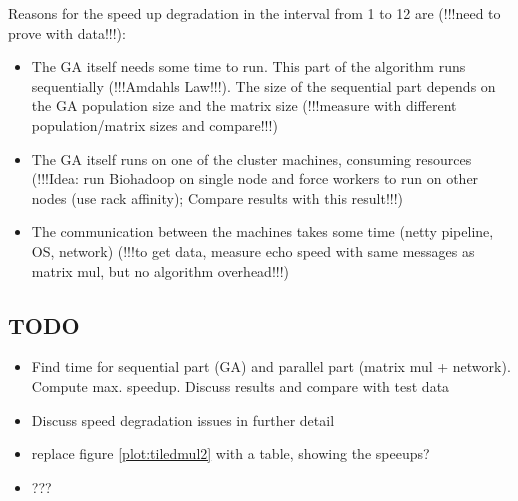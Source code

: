\documentclass{article}
\begin{document}
Reasons for the speed up degradation in the interval from 1 to 12 are (!!!need to prove with data!!!):
\begin{itemize}
  \item The GA itself needs some time to run. This part of the algorithm runs sequentially (!!!Amdahls Law!!!). The size of the sequential part depends on the GA population size and the matrix size (!!!measure with different population/matrix sizes and compare!!!)
  \item The GA itself runs on one of the cluster machines, consuming resources (!!!Idea: run Biohadoop on single node and force workers to run on other nodes (use rack affinity); Compare results with this result!!!)
  \item The communication between the machines takes some time (netty pipeline, OS, network) (!!!to get data, measure echo speed with same messages as matrix mul, but no algorithm overhead!!!)
\end{itemize}

\subsection{TODO}
\begin{itemize}
  \item Find time for sequential part (GA) and parallel part (matrix mul + network). Compute max. speedup. Discuss results and compare with test data
  \item Discuss speed degradation issues in further detail
  \item replace figure \ref{plot:tiledmul2} with a table, showing the speeups?
  \item ???
\end{itemize}
\end{document}
